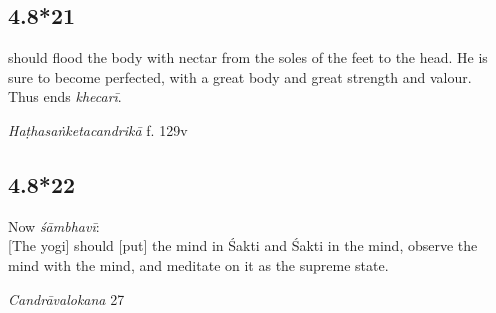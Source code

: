 \begin{ekdosis}
\subsection*{4.8*21}
\begin{translation} should flood the body with nectar from the soles of the feet to the head. He is sure to become perfected, with a great body and great strength and valour.\\Thus ends \emph{khecarī}.
\end{translation}


\begin{testimonia}[hp04_008_21]
\emph{Haṭhasaṅketacandrikā} f. 129v
\begin{versinnote}
\end{versinnote}
\end{testimonia}


\subsection*{4.8*22}
\begin{translation}[hp04_008_22]
Now \emph{śāmbhavī}:\\
{[}The yogi] should [put] the mind in Śakti and Śakti in the mind, observe the mind with the mind, and meditate on it as the supreme state.
\end{translation}


\begin{sources}[hp04_008_22]
\emph{Candrāvalokana} 27
\begin{versinnote}
\tl{\var{madhyamam ] madhyagaṃ 4340}\\+}
\tl{\var{taṃ dhyāyet ] tad dhyāyet 4340}\\!}
\end{versinnote}
\end{sources}


\end{ekdosis}
